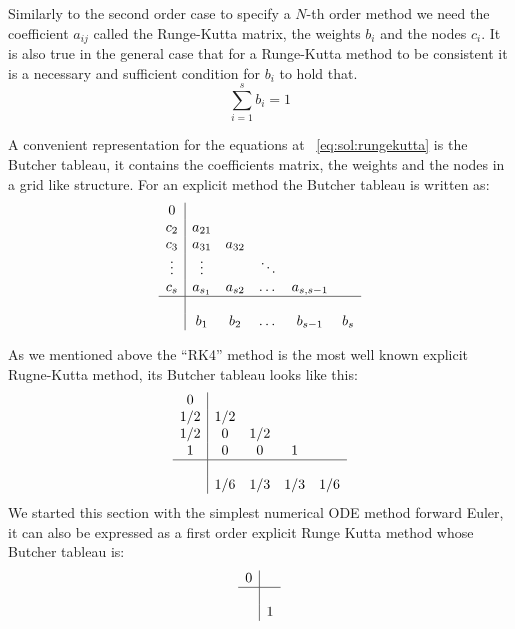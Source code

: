 \documentclass[11pt]{report}
\begin{document}
    Similarly to the second order case to specify a $N$-th order method we need the coefficient $a_{ij}$ called the
    Runge-Kutta matrix, the weights $b_i$ and the nodes $c_i$.
    It is also true in the general case that for a Runge-Kutta method to be consistent it is a necessary and sufficient
    condition for $b_i$ to hold that.
    \begin{equation*}
        \sum_{i=1}^{s} b_i = 1
    \end{equation*}

    A convenient representation for the equations at ~\eqref{eq:sol:rungekutta} is the Butcher tableau, it contains
    the coefficients matrix, the weights and the nodes in a grid like structure.
    For an explicit method the Butcher tableau is written as:
    \begin{equation*}
        \begin{array}
        {c|cccccc}
            0 \\
            c_2 & a_{21} \\
            c_3 & a_{31} & a_{32} \\
            \vdots & \vdots & & \ddots \\
            c_s & a_{s_1} & a_{s2} & \dots & a_{s,s-1} \\
            \hline \\
            & b_1 & b_2 & \dots & b_{s-1} & b_{s}
        \end{array}
    \end{equation*}

    As we mentioned above the ``RK4'' method is the most well known explicit Rugne-Kutta method, its Butcher tableau
    looks like this:
    \begin{equation*}
        \begin{array}
        {c|cccc}
            0 \\
            1/2 & 1/2 \\
            1/2 & 0 & 1/2 \\
            1 & 0 & 0 & 1 \\
            \hline \\
            & 1/6 & 1/3 & 1/3 & 1/6
        \end{array}
    \end{equation*}
    We started this section with the simplest numerical ODE method forward Euler, it can also be expressed as a first
    order explicit Runge Kutta method whose Butcher tableau is:
    \begin{equation*}
        \begin{array}
        {c|c}
            0 \\
            \hline \\
            & 1
        \end{array}
    \end{equation*}
\end{document}
